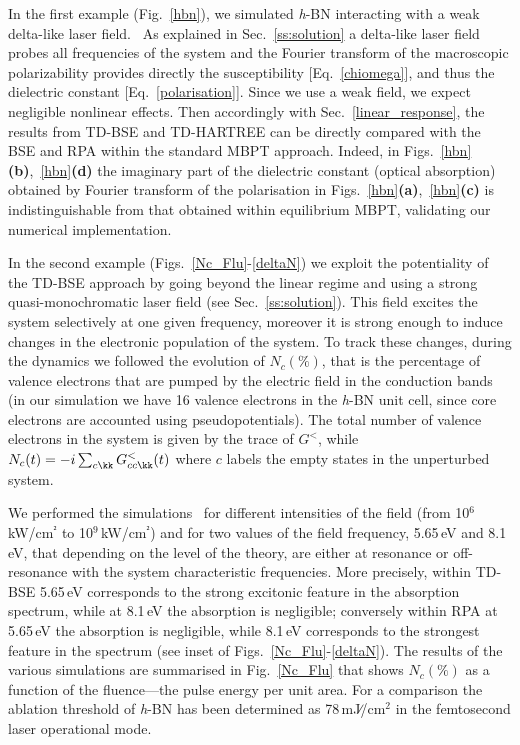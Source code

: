 In the first example (Fig.~\ref{hbn}), we simulated {\it h}-BN interacting with a
weak delta-like laser field.~\cite{sim1} As explained in Sec.~\ref{ss:solution}
a delta-like laser field probes all frequencies of the system and
the Fourier transform of the macroscopic polarizability provides directly the susceptibility [Eq.~\eqref{chiomega}], and thus the dielectric
constant [Eq.~\eqref{polarisation}]. Since we use a weak field, we
expect negligible nonlinear effects. Then accordingly with Sec.~\ref{linear_response},  the results from
TD-BSE and TD-HARTREE can be directly compared with the BSE and RPA within
the standard MBPT approach. Indeed, in Figs.~\ref{hbn}{\bf (b)},~\ref{hbn}{\bf (d)} the imaginary part of the dielectric constant
(optical absorption) obtained by Fourier transform of the polarisation
in Figs.~\ref{hbn}{\bf (a)},~\ref{hbn}{\bf (c)} is indistinguishable from that
obtained within equilibrium MBPT, validating our numerical
implementation.

In the second example (Figs.~\ref{Nc_Flu}-\ref{deltaN}) we exploit the potentiality of the TD-BSE
approach by going beyond the linear regime and using a strong
quasi-monochromatic laser field (see Sec.~\ref{ss:solution}). This field excites the system
selectively at one given frequency, moreover it is strong enough
to induce changes in the electronic population
of the system. To track these changes, during the dynamics we followed the evolution of 
$N_c(\%)$, that is the percentage of valence electrons that are pumped by the electric field in the conduction bands
(in our simulation we  have 16 valence electrons in the {\it h}-BN unit cell, since core electrons are accounted using
pseudopotentials).
The total number of valence electrons in the system is given by
the trace of $G^<$, while $N_c(t) = -i\sum_{c\kk} G^<_{cc\kk}(t)$
where $c$ labels the empty states in the unperturbed system.

We performed the simulations~\cite{sim2} for different intensities of the field (from 10$^6$\,kW/cm$^²$ to  10$^9$\,kW/cm$^²$) and for two 
values of the field frequency, 5.65\,eV and 8.1\,eV, that depending on
the level of the theory, are either at resonance or off-resonance with
the system characteristic frequencies. More precisely, within TD-BSE 5.65\,eV corresponds to the
strong excitonic feature in the absorption spectrum, while at 8.1\,eV the absorption is
negligible; conversely within RPA at 5.65\,eV the absorption is
negligible, while 8.1\,eV corresponds to the strongest feature in
the spectrum (see inset of
Figs.~\ref{Nc_Flu}-\ref{deltaN}). The results of the various
simulations are summarised in Fig.~\ref{Nc_Flu} that shows $N_c(\%)$ as
a function of the fluence---the pulse energy per unit area. For a
comparison the ablation threshold of {\it h}-BN has been determined as
78\,mJ∕/cm$^2$ in the femtosecond laser operational
mode.~\cite{10.1063/1.1787909}     

